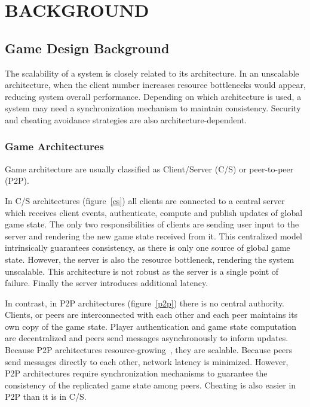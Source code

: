 \documentclass{sigchi}
\newcommand{\cs}{C\slash S}
\begin{document}
\section{BACKGROUND}
\label{background}


\subsection{Game Design Background}
\label{gamedesignbg}

The scalability of a system is closely related to its architecture. In an unscalable architecture, when the client number increases resource bottlenecks would appear, reducing system overall performance. Depending on which architecture is used, a system may need a synchronization mechanism to maintain consistency. Security and cheating avoidance strategies are also architecture-dependent.

\subsubsection{Game Architectures}
\label{game_archi}

Game architecture are usually classified as Client\slash Server (\cs) or peer-to-peer (P2P). 

In {\cs} architectures (figure~\ref{cs}) all clients are connected to a central server which receives client events, authenticate, compute and publish updates of global game state. The only two responsibilities of clients are sending user input to the server and rendering the new game state received from it. This centralized model intrinsically guarantees consistency, as there is only one source of global game state. However, the server is also the resource bottleneck, rendering the system unscalable. This architecture is not robust as the server is a single point of failure. Finally the server introduces additional latency.

In contrast, in P2P architectures (figure~\ref{p2p}) there is no central authority. Clients, or peers are interconnected with each other and each peer maintains its own copy of the game state. Player authentication and game state computation are decentralized and peers send messages asynchronously to inform updates. Because P2P architectures resource-growing~\cite{Scheating}, they are scalable. Because peers send messages directly to each other, network latency is minimized. However, P2P architectures require synchronization mechanisms to guarantee the consistency of the replicated game state among peers. Cheating is also easier in P2P than it is in {\cs}.
\end{document}
